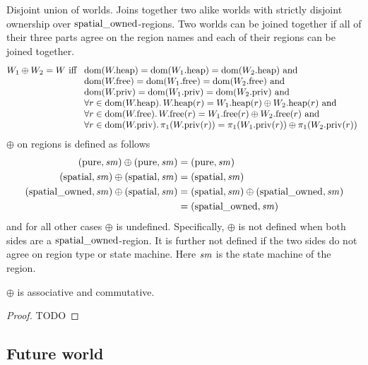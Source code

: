 \documentclass[a4paper]{article}
\begin{document}
Disjoint union of worlds. Joins together two alike worlds with strictly disjoint ownership over $\spatialo$-regions. Two worlds can be joined together if all of their three parts agree on the region names and each of their regions can be joined together.
\[
  W_1 \oplus W_2 = W
  \text{ iff }
  \begin{array}[t]{l}
    \text{$\dom(\pwheap) = \dom(\pwheap[W_1]) = \dom(\pwheap[W_2]) \tand$} \\
    \text{$\dom(\pwfree) = \dom(\pwfree[W_1]) = \dom(\pwfree[W_2]) \tand$} \\
    \text{$\dom(\pwpriv) = \dom(\pwpriv[W_1]) = \dom(\pwpriv[W_2]) \tand$} \\
    \forall r \in \dom(\pwheap) \ldotp \pwheap(r) = \pwheap[W_1](r) \oplus \pwheap[W_2](r) \tand \\
    \forall r \in \dom(\pwfree) \ldotp \pwfree(r) = \pwfree[W_1](r) \oplus \pwfree[W_2](r) \tand \\
    \forall r \in \dom(\pwpriv) \ldotp \pi_1(\pwpriv(r)) = \pi_1(\pwpriv[W_1](r)) \oplus \pi_1(\pwpriv[W_2](r))
  \end{array}
\]
$\oplus$ on regions is defined as follows
\begin{align*}
  (\pure,\var{sm}) \oplus (\pure,\var{sm}) =  & \; (\pure,\var{sm}) \\
  (\spatial,\var{sm}) \oplus (\spatial,\var{sm}) =  & \; (\spatial,\var{sm}) \\
  (\spatialo,\var{sm}) \oplus (\spatial,\var{sm}) = & \; (\spatial,\var{sm}) \oplus (\spatialo,\var{sm})\\
                                           =  & \; (\spatialo,\var{sm})
\end{align*}
and for all other cases $\oplus$ is undefined. Specifically, $\oplus$ is not defined when both sides are a $\spatialo$-region. It is further not defined if the two sides do not agree on region type or state machine. Here $\var{sm}$ is the state machine of the region.

\begin{lemma}
  $\oplus$ is associative and commutative.
\end{lemma}
\begin{proof}
  TODO
\end{proof}

\subsection{Future world}
\end{document}
